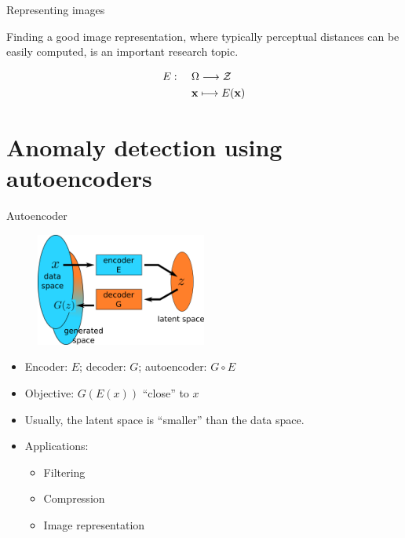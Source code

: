 \documentclass[xcolor=pdftex,dvipsnames,table,mathserif]{beamer}
\begin{document}
\begin{frame}{Representing images}

\begin{block}{}
  Finding a good image representation, where typically perceptual distances can be easily computed, is an important research topic.
\end{block}

    \[
    \begin{split}
    E: & ~~~~\Omega \longrightarrow \mathcal{Z} \\
    & ~~~~ \mathbf{x} \longmapsto E(\mathbf{x})
    \end{split}
    \]

\end{frame}



\section{Anomaly detection using autoencoders}


\begin{frame}{Autoencoder}

  \begin{figure}[ht]
    \centering
    \includegraphics[width=0.5\textwidth]{ae.png}
  \end{figure}

  \begin{itemize}
  \item Encoder: $E$; decoder: $G$; autoencoder: $G \circ E$
  \item Objective: $G(E(x))$ ``close'' to $x$
  \item Usually, the latent space is ``smaller'' than the data space.
  \item Applications:
   \begin{itemize}
   \item Filtering
   \item Compression
   \item Image representation
   \end{itemize}
  \end{itemize}

\end{frame}
\end{document}
